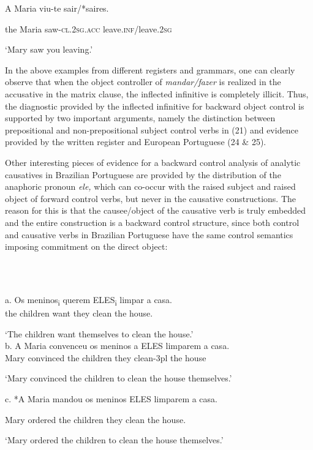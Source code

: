 \documentclass[output=paper]{langsci/langscibook}
\begin{document}
A   Maria viu-te           sair/*saires.

  the Maria saw-\textsc{cl.2sg.acc} leave.\textsc{inf}/leave.\textsc{2sg}

  ‘Mary saw you leaving.’

In the above examples from different registers and grammars, one can clearly observe that when the object controller of \textit{mandar/fazer}\textbf{ }is realized in the accusative in the matrix clause, the inflected infinitive is completely illicit. Thus, the diagnostic provided by the inflected infinitive for backward object control is supported by two important arguments, namely the distinction between prepositional and non{}-prepositional subject control verbs in (21) and evidence provided by the written register and European Portuguese (24 \& 25).

Other interesting pieces of evidence for a backward control analysis of analytic causatives in Brazilian Portuguese are provided by the distribution of the anaphoric pronoun \textit{ele,} which can co-occur with the raised subject and raised object of forward control verbs, but never in the causative constructions. The reason for this is that the causee/object of the causative verb is truly embedded and the entire construction is a backward control structure, since both control and causative verbs in Brazilian Portuguese have the same control semantics imposing commitment on the direct object:

\ea%
    \label{ex:moreno:26}
    \gll\\
        \\
    \glt
    \z

          a.   Os meninos\textsubscript{i} querem ELES\textsubscript{i} limpar a casa.\\
              the children  want     they     clean the house.

‘The children want themselves to clean the house.’\\
 b.   A Maria convenceu os meninos a ELES limparem a casa.\\
    Mary      convinced the children they clean-3pl the house

‘Mary convinced the children to clean the house themselves.’

c.  *A Maria mandou os meninos ELES limparem a casa.

    Mary        ordered the children they    clean       the house.

    ‘Mary ordered the children to clean the house themselves.’     
\end{document}
